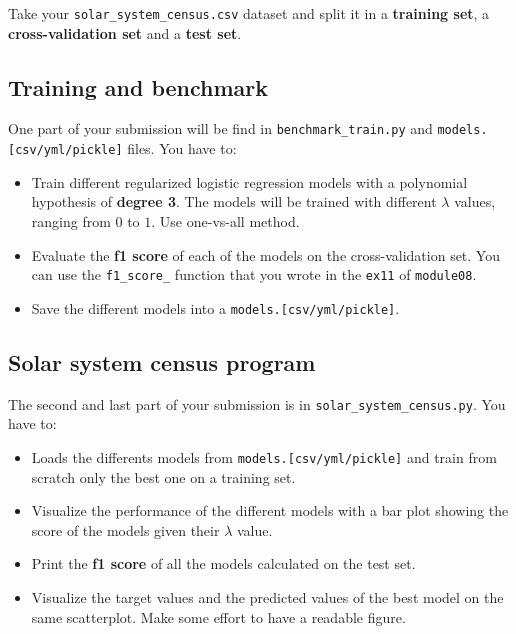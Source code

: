 \documentclass{42-en}
\begin{document}
Take your \texttt{solar\_system\_census.csv} dataset and split it in a \textbf{training set}, a \textbf{cross-validation set}
and  a \textbf{test set}.

\subsection*{Training and benchmark}
One part of your submission will be find in \texttt{benchmark\_train.py} and \texttt{models.[csv/yml/pickle]} files.
You have to:
\begin{itemize}
  \item Train different regularized logistic regression models with a polynomial hypothesis of \textbf{degree 3}.
        The models will be trained with different $\lambda$ values, ranging from $0$ to $1$.
        Use one-vs-all method.
  \item Evaluate the \textbf{f1 score} of each of the models on the cross-validation set.
        You can use the \texttt{f1\_score\_} function that you wrote in the \texttt{ex11} of \texttt{module08}.
  \item Save the different models into a \texttt{models.[csv/yml/pickle]}.
\end{itemize}

\subsection*{Solar system census program}
The second and last part of your submission is in \texttt{solar\_system\_census.py}. You have to:
\begin{itemize}
  \item Loads the differents models from \texttt{models.[csv/yml/pickle]} and train from scratch only the best one on a training set.
  \item Visualize the performance of the different models with a bar plot showing the score of the models given their $\lambda$ value.
  \item Print the \textbf{f1 score} of all the models calculated on the test set.
  \item Visualize the target values and the predicted values of the best model on the same scatterplot. Make some effort to have a readable figure.
\end{itemize}

\end{document}
